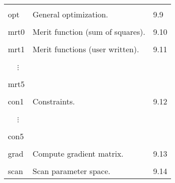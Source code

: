 \begin{center}
\begin{tabular}{lll}
\vspace{-3mm}& &\\
\hspace{1.5em}opt    &     General optimization.        &     \hspace{2em}9.9\\
\vspace{-3mm}& &\\
\hspace{1.5em}mrt0   &     Merit function (sum of squares).   &   \hspace{2em}9.10\\
\vspace{-3mm}& &\\
\hspace{1.5em}mrt1    &    Merit functions (user written).   &    \hspace{2em}9.11\\
\vspace{-7mm}& &\\
\hspace{1.5em}\ \ \,$\vdots$ & &\\
\vspace{-7mm}& &\\
\hspace{1.5em}mrt5 & & \\
\vspace{-3mm}& &\\
\hspace{1.5em}con1   &     Constraints.               &        \hspace{2em}9.12\\
\vspace{-7mm}& &\\
\hspace{1.5em}\ \ \,$\vdots$ & &\\
\vspace{-7mm}& &\\
\hspace{1.5em}con5 & & \\
\vspace{-3mm}& &\\
\hspace{1.5em}grad    &    Compute gradient matrix.       &     \hspace{2em}9.13\\
\vspace{-3mm}& &\\
\hspace{1.5em}scan    &    Scan parameter space.         &     \hspace{2em}9.14\\

\end{tabular}
\end{center}
